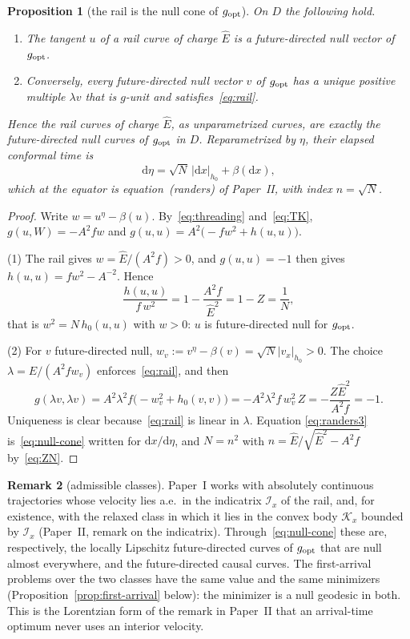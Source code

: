 \documentclass[aip,jmp,amsmath,amssymb,reprint]{revtex4-2}
\newcommand{\Ehat}{\hat E}
\newcommand{\dd}{\mathrm{d}}
\newcommand{\gopt}{g_{\rm opt}}
\theoremstyle{plain}
\newtheorem{proposition}{Proposition}[section]
\theoremstyle{definition}
\newtheorem{remark}[proposition]{Remark}
\begin{document}
\begin{proposition}[the rail is the null cone of $\gopt$]\label{prop:rail-null}
On $D$ the following hold.
\begin{enumerate}
\item The tangent $u$ of a rail curve of charge $\Ehat$ is a future-directed null vector
  of $\gopt$.
\item Conversely, every future-directed null vector $v$ of $\gopt$ has a unique positive
  multiple $\lambda v$ that is $g$-unit and satisfies~\eqref{eq:rail}.
\end{enumerate}
Hence the rail curves of charge $\Ehat$, as unparametrized curves, are exactly the
future-directed null curves of $\gopt$ in $D$. Reparametrized by $\eta$, their elapsed
conformal time is
\begin{equation}
  \dd\eta=\sqrt N\,|\dd x|_{h_0}+\beta(\dd x),
  \label{eq:randers3}
\end{equation}
which at the equator is equation~(randers) of Paper~II, with index $n=\sqrt N$.
\end{proposition}

\begin{proof}
Write $w=u^\eta-\beta(u)$. By~\eqref{eq:threading} and~\eqref{eq:TK},
$g(u,W)=-A^2fw$ and $g(u,u)=A^2\big(-fw^2+h(u,u)\big)$.

(1) The rail gives $w=\Ehat/(A^2f)>0$, and $g(u,u)=-1$ then gives
$h(u,u)=fw^2-A^{-2}$. Hence
\[
  \frac{h(u,u)}{f\,w^2}=1-\frac{A^2f}{\Ehat^2}=1-Z=\frac1N ,
\]
that is $w^2=N\,h_0(u,u)$ with $w>0$: $u$ is future-directed null for $\gopt$.

(2) For $v$ future-directed null, $w_v:=v^\eta-\beta(v)=\sqrt N|v_x|_{h_0}>0$. The
choice $\lambda=\Ehat/(A^2fw_v)$ enforces~\eqref{eq:rail}, and then
\[
  g(\lambda v,\lambda v)=A^2\lambda^2f\big(-w_v^2+h_0(v,v)\big)
  =-A^2\lambda^2 f\,w_v^2\,Z=-\frac{Z\Ehat^2}{A^2f}=-1 .
\]
Uniqueness is clear because~\eqref{eq:rail} is linear in $\lambda$. Equation
\eqref{eq:randers3} is~\eqref{eq:null-cone} written for $\dd x/\dd\eta$, and $N=n^2$ with
$n=\Ehat/\sqrt{\Ehat^2-A^2f}$ by~\eqref{eq:ZN}.
\end{proof}

\begin{remark}[admissible classes]\label{rmk:classes}
Paper~I works with absolutely continuous trajectories whose velocity lies a.e.\ in the
indicatrix $\mathcal I_x$ of the rail, and, for existence, with the relaxed class in
which it lies in the convex body $\mathcal K_x$ bounded by $\mathcal I_x$ (Paper~II,
remark on the indicatrix). Through~\eqref{eq:null-cone} these are, respectively, the
locally Lipschitz future-directed curves of $\gopt$ that are null almost everywhere,
and the future-directed causal curves. The first-arrival problems over the two classes
have the same value and the same minimizers (Proposition~\ref{prop:first-arrival}
below): the minimizer is a null geodesic in both. This is the Lorentzian form of the
remark in Paper~II that an arrival-time optimum never uses an interior velocity.
\end{remark}
\end{document}
